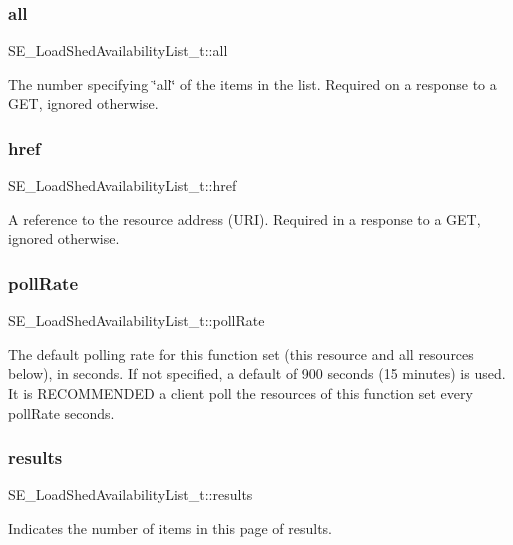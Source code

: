 \subsubsection{\texorpdfstring{all}{all}}
{\footnotesize\ttfamily S\+E\+\_\+\+Load\+Shed\+Availability\+List\+\_\+t\+::all}

The number specifying \char`\"{}all\char`\"{} of the items in the list. Required on a response to a G\+ET, ignored otherwise. \mbox{\label{group__LoadShedAvailabilityList_ga759f6f998744203770c7908f3f157784}} 
\subsubsection{\texorpdfstring{href}{href}}
{\footnotesize\ttfamily S\+E\+\_\+\+Load\+Shed\+Availability\+List\+\_\+t\+::href}

A reference to the resource address (U\+RI). Required in a response to a G\+ET, ignored otherwise. \mbox{\label{group__LoadShedAvailabilityList_gacd95c2260e71af84870c073faceef2bc}} 
\subsubsection{\texorpdfstring{poll\+Rate}{pollRate}}
{\footnotesize\ttfamily S\+E\+\_\+\+Load\+Shed\+Availability\+List\+\_\+t\+::poll\+Rate}

The default polling rate for this function set (this resource and all resources below), in seconds. If not specified, a default of 900 seconds (15 minutes) is used. It is R\+E\+C\+O\+M\+M\+E\+N\+D\+ED a client poll the resources of this function set every poll\+Rate seconds. \mbox{\label{group__LoadShedAvailabilityList_gab30e5d3f4e29c7b26f294be2f5563a4f}} 
\subsubsection{\texorpdfstring{results}{results}}
{\footnotesize\ttfamily S\+E\+\_\+\+Load\+Shed\+Availability\+List\+\_\+t\+::results}

Indicates the number of items in this page of results. 